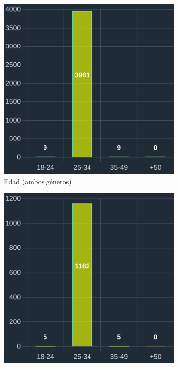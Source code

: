 \begin{figure}[H]
  \centering
  \begin{subfigure}{0.3\textwidth}
   \includegraphics[width=\textwidth]{imaxes/capturas-app/graficos/modaresi/grafico-edad-moda.png}
  \caption{Edad (ambos géneros)}
  \label{subfig:blm/resultados-edad-moda}
  \end{subfigure}
  \begin{subfigure}{0.3\textwidth}
   \includegraphics[width=\textwidth]{imaxes/capturas-app/graficos/modaresi/grafico-edad-moda-fem.png}

\end{subfigure}
\end{figure}
